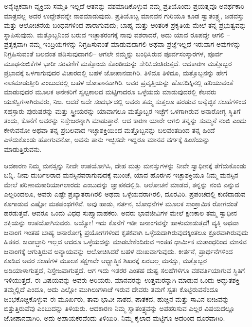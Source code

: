 \vskip 6pt

ಅನೈಚ್ಛಿಕವಾಗಿ ವ್ಯಕ್ತಿಯ ಸಮ್ಮತಿ ಇಲ್ಲದೆ ಆತನನ್ನು ವಶಮಾಡಿಕೊಳ್ಳುವ ನಮ್ಮ ಪ್ರತಿಯೊಂದು ಪ್ರಯತ್ನವೂ ಅನರ್ಥಕಾರಿ ಮಾತ್ರವಲ್ಲ ಅದರ ಉದ್ದೇಶವನ್ನೇ ನಾಶಮಾಡುವುದು. ಪ್ರತಿಯೊಬ್ಬ ಮಾನವನ ಗುರಿಯೂ ಕೂಡ ಸ್ವಾತಂತ್ರ್ಯ, ಜಡವಸ್ತು ಮತ್ತು ಆಲೋಚನೆಯ ಬಂಧನಗಳಿಂದ ಪಾರಾಗುವುದು; ಬಾಹ್ಯ ಮತ್ತು ಆಂತರಿಕ ಪ್ರಕೃತಿಯ ಮೇಲೆ ತನ್ನ ಪ್ರಭುತ್ವವನ್ನು ಸ್ಥಾಪಿಸುವುದು. ಮತ್ತೊಬ್ಬನಿಂದ ಬರುವ ಇಚ್ಛಾತರಂಗಕ್ಕೆ ನಾವು ವಶರಾದರೆ, ಅದು ಯಾವ ರೂಪದ್ದೇ ಆಗಲಿ – ಪ್ರತ್ಯಕ್ಷವಾಗಿ ನಮ್ಮ ಇಂದ್ರಿಯಗಳನ್ನು ನಿಗ್ರಹಿಸುವಂತೆ ಮಾಡುವುದಾಗಲಿ ಅಥವಾ ಪ್ರಜ್ಞೆಇಲ್ಲದೆ ಇರುವಾಗ ಅವುಗಳನ್ನು ನಿಗ್ರಹಿಸುವಂತೆ ಬಲವಂತ ಪಡಿಸುವುದಾಗಲಿ– ಆಗಲೇ ನಮ್ಮನ್ನು ಬಂಧಿಸಿರುವ ಪೂರ್ವಸಂಸ್ಕಾರಗಳ, ಪೂರ್ವ ಮೂಢನಂಬಿಕೆಗಳ ಭಾರೀ ಸರಪಣಿಗೆ ಮತ್ತೊಂದು ಕೊಂಡಿಯನ್ನು ಸೇರಿಸಿದಂತಿರುತ್ತದೆ. ಆದಕಾರಣ ಮತ್ತೊಬ್ಬರ ಪ್ರಭಾವಕ್ಕೆ ಒಳಗಾಗುವುದರ ವಿಚಾರದಲ್ಲಿ ಬಹಳ ಜೋಪಾನವಾಗಿರಿ. ತಿಳಿದೂ ತಿಳಿದೂ, ಮತ್ತೊಬ್ಬನನ್ನು ಹೇಗೆ ನಾಶಮಾಡುತ್ತೀರಿ ಎಂಬುದರಲ್ಲಿ ಬಹಳ ಜೋಪಾನವಾಗಿರಿ. ಅವರ ಪ್ರವೃತ್ತಿಯನ್ನು ಹೊಸದಿಕ್ಕಿನಲ್ಲಿ ಹರಿಯುವಂತೆ ಮಾಡುವುದರ ಮೂಲಕ ಅನೇಕರಿಗೆ ಸ್ವಲ್ಪಕಾಲದ ಮಟ್ಟಿಗಾದರೂ ಒಳ್ಳೆಯದು ಮಾಡುವುದರಲ್ಲಿ ಕೆಲವರು ಯಶಸ್ವಿಗಳಾಗಿರುವರು, ನಿಜ. ಆದರೆ ಅದೇ ಸಂದರ್ಭದಲ್ಲಿ ಅವರು ತಮ್ಮ ಸುತ್ತಲೂ ಹರಡುವ ಅನೈಚ್ಛಿಕ ಸಲಹೆಗಳಿಂದ ಸಹಸ್ರಾರು ಪುರುಷರನ್ನು ಮತ್ತು ಸ್ತ್ರೀಯರನ್ನು ಯಾವಾಗಲೂ ಮತ್ತೊಬ್ಬರ ಇಚ್ಛೆಗೆ ಒಳಗಾಗಿರುವ ಅನಾರೋಗ್ಯ ಸ್ಥಿತಿಗೆ ತಂದು, ಕೊನೆಗೆ ಅವರನ್ನು ನಿಸ್ತೇಜರನ್ನಾಗಿ ಮಾಡುತ್ತಾರೆ. ಆದ ಕಾರಣ ಯಾರೇ ಆಗಲಿ ತನ್ನನ್ನು ಸುಮ್ಮನೆ ನಂಬಿ ಎಂದು ಕೇಳುವನೋ ಅಥವಾ ತನ್ನ ಪ್ರಬಲವಾದ ಇಚ್ಛಾಶಕ್ತಿಯಿಂದ ಮತ್ತೊಬ್ಬನನ್ನು ಬಲವಂತದಿಂದ ತನ್ನ ಹಿಂದೆ ಎಳೆದುಕೊಂಡು ಹೋಗುವನೋ, ಅವನು ತಾನು ಇಚ್ಛಿಸದೇ ಇದ್ದರೂ ಮಾನವ ವರ್ಗಕ್ಕೆ ಹಿಂಸೆಯನ್ನು ಮಾಡುತ್ತಿರುವನು. 

\vskip 6pt

ಆದಕಾರಣ ನಿಮ್ಮ ಮನಸ್ಸನ್ನು ನೀವೇ ಉಪಯೋಗಿಸಿ, ದೇಹ ಮತ್ತು ಮನಸ್ಸುಗಳನ್ನು ನೀವೇ ಸ್ವಾಧೀನಕ್ಕೆ ತೆಗೆದುಕೊಂಡು ಬನ್ನಿ. ನೀವು ದುರ್ಬಲರಾದ ಮನಸ್ಸಿನವರಾಗುವುದಕ್ಕೆ ಮುಂಚೆ, ಯಾವ ಹೊರಗಿನ ಇಚ್ಛಾಶಕ್ತಿಯೂ ನಿಮ್ಮ ಮನಸ್ಸಿನ ಮೇಲೆ ಪರಿಣಾಮಕಾರಿಯಾಗಲಾರದು ಎಂಬುದನ್ನು ಜ್ಞಾಪಕದಲ್ಲಿಡಿ. ಆಲೋಚನೆ ಮಾಡದೆ, ತನ್ನನ್ನು ನಂಬಿ ಎನ್ನುವ ಎಲ್ಲರಿಂದಲೂ, ಅವರು ಎಷ್ಟೇ ಪ್ರಖ್ಯಾತರಾಗಿರಲಿ ಅಥವಾ ಒಳ್ಳೆಯವರಾಗಿರಲಿ, ದೂರವಿರಿ. ಪ್ರಪಂಚದಲ್ಲಿ ಕುಣಿದಾಡುವ ಕೂಗಾಡುವ ಎಷ್ಟೋ ಮತಪಂಥಗಳಿವೆ. ಅವು ಹಾಡು, ನರ್ತನ, ಬೋಧನೆಗಳ ಮೂಲಕ ಸಾಂಕ್ರಾಮಿಕ ರೋಗದಂತೆ ಹರಡುತ್ತವೆ. ಆವರೂ ಒಂದು ವಿಧಧ ಸುಪ್ತ್ಯಾವಾಹಕರು. ಅವರು ಭಾವಜೀವಿಗಳ ಮೇಲೆ ಕ್ಷಣಕಾಲ ತಮ್ಮ ಸ್ವಾಧೀನ ಶಕ್ತಿಯನ್ನು ಉಪಯೋಗಿಸುವರು. ಅಯ್ಯೋ! ಇದು ಕೊನೆಗೆ ಇಡೀ ಜನಾಂಗವನ್ನೇ ಹಾಳುಮಾಡುತ್ತದೆ! ವ್ಯಕ್ತಿ ಅಥವಾ ಜನಾಂಗ ಇಂತಹ ಬಾಹ್ಯ ಅನಾರೋಗ್ಯ ಪ್ರಯೋಗಗಳಿಂದ ಕೃತಕವಾಗಿ ಒಳ್ಳೆಯದಾಗಿರುವುದಕ್ಕಿಂತಲೂ ಕ್ರೂರವಾಗಿರುವುದು ಹಿತಕರ. ಜವಾಬ್ದಾರಿ ಇಲ್ಲದ ಆದರೂ ಒಳ್ಳೆಯದನ್ನು ಮಾಡಬೇಕೆಂದಿರುವ ಇಂತಹ ಧಾರ್ಮಿಕ ಮತಾಂಧರಿಂದ ಮಾನವ ಜನಾಂಗಕ್ಕೆ ಆಗುತ್ತಿರುವ ಅನ್ಯಾಯವನ್ನು ಆಲೋಚಿಸಿದರೆ ಬಹಳ ದುಃಖವಾಗುವುದು. ಕೀರ್ತನೆ, ಪ್ರಾರ್ಥನೆಗಳಿಂದ ಕೂಡಿದ ಅವರ ಸಲಹೆಗಳ ಮೂಲಕ ತಕ್ಷಣವೇ ಆಧ್ಯಾತ್ಮಿಕ ಶಿಖರಕ್ಕೆ ಏರಬಲ್ಲ ಮನಸ್ಸು, ಮತ್ತೊಬ್ಬರ ಅಡಿಯಾಳಾಗುತ್ತದೆ, ನಿಸ್ತೇಜವಾಗುತ್ತದೆ. ಆಗ ಇದು ಇತರರ ಎಂತಹ ದುಷ್ಟ ಸಲಹೆಗಳಿಗೂ ವಶವರ್ತಿಯಾಗುವ ಸ್ಥಿತಿಗೆ ಇಳಿಯುತ್ತದೆ. ಈ ವಿಷಯವನ್ನು ಅವರು ಅರಿಯರು. ಮಾನವರನ್ನು ಉತ್ತಮರನ್ನಾಗಿ ಮಾಡುವ ಒಂದು ಅದ್ಭುತಶಕ್ತಿ ತಮ್ಮಲ್ಲಿದೆ ಎಂದೂ, ಅದು ಎಲ್ಲೋ ಮುಗಿಲುಗಳಾಚೆ ಇರುವ ದೇವರು ತಮಗೆ ಸ್ವತಃ ಕೊಟ್ಟಿರುವನೆಂದೂ ಜಂಭಕೊಚ್ಚಿಕೊಳ್ಳುವ ಈ ಮೂರ್ಖರು, ತಾವು ಭಾವೀ ನಾಶದ, ಪಾತಕದ, ಹುಚ್ಚಿನ ಮತ್ತು ಸಾವಿನ ಬೀಜವನ್ನು ಬಿತ್ತುತ್ತಿರುವೆವು ಎಂಬುದನ್ನು ತಿಳಿಯರು. ಆದಕಾರಣ ನಿಮ್ಮ ಸ್ವಾತಂತ್ರ್ಯವನ್ನು ಅಪಹರಿಸುವ ಎಲ್ಲರ ವಿಷಯದಲ್ಲೂ ಜೋಪಾನವಾಗಿರಿ. ಅದು ಅಪಾಯಕರವೆಂದು ತಿಳಿಯಿರಿ. ನಿಮ್ಮ ಕೈಲಾದ ಮಟ್ಟಿಗೂ ಅದರಿಂದ ದೂರವಾಗಿರಿ. 

